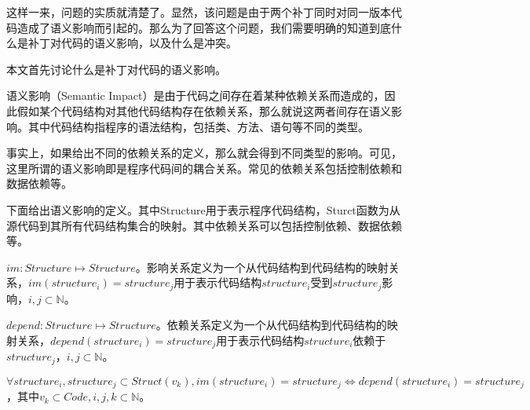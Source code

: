 这样一来，问题的实质就清楚了。显然，该问题是由于两个补丁同时对同一版本代码造成了语义影响而引起的。那么为了回答这个问题，我们需要明确的知道到底什么是补丁对代码的语义影响，以及什么是冲突。

本文首先讨论什么是补丁对代码的语义影响。

语义影响（Semantic Impact）是由于代码之间存在着某种依赖关系而造成的，因此假如某个代码结构对其他代码结构存在依赖关系，那么就说这两者间存在语义影响。其中代码结构指程序的语法结构，包括类、方法、语句等不同的类型。

%	

事实上，如果给出不同的依赖关系的定义，那么就会得到不同类型的影响。可见，这里所谓的语义影响即是程序代码间的耦合关系。常见的依赖关系包括控制依赖和数据依赖等。

下面给出语义影响的定义。其中Structure用于表示程序代码结构，Sturct函数为从源代码到其所有代码结构集合的映射。其中依赖关系可以包括控制依赖、数据依赖等。



\begin{definition}
	$im: Structure \mapsto Structure$。影响关系定义为一个从代码结构到代码结构的映射关系，$im(structure_i) = structure_j$用于表示代码结构$structure_i$受到$structure_j$影响，$i,j \subset \mathbb{N}$。
\end{definition}

\begin{definition}
	$depend: Structure \mapsto Structure$。依赖关系定义为一个从代码结构到代码结构的映射关系，$depend(structure_i) = structure_j$用于表示代码结构$structure_i$依赖于$structure_j$，$i,j \subset \mathbb{N}$。
\end{definition}

\begin{definition}
	$\forall structure_i,structure_j \subset Struct(v_k),  im(structure_i) = structure_j \iff depend(structure_i) = structure_j$，其中$v_k \subset Code,i,j,k \subset \mathbb{N}$。
\end{definition}

